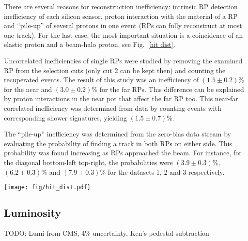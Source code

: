 \documentclass[doublecol]{../macros/epl2}
\def\un#1{\,{\rm #1}}
\begin{document}
There are several reasons for reconstruction inefficiency: intrinsic RP detection inefficiency of each silicon sensor, proton interaction with the material of a RP and ``pile-up'' of several protons in one event (RPs can fully reconstruct at most one track). For the last case, the most important situation is a coincidence of an elastic proton and a beam-halo proton, see Fig.~\ref{hit dist}.

Uncorrelated inefficiencies of single RPs were studied by removing the examined RP from the selection cuts (only cut 2 can be kept then) and counting the recuperated events. The result of this study was an inefficiency of $(1.5 \pm 0.2)\%$ for the near and $(3.0 \pm 0.2)\%$ for the far RPs. This difference can be explained by proton interactions in the near pot that affect the far RP too. This near-far correlated inefficiency was determined from data by counting events with corresponding shower signatures, yielding $(1.5\pm 0.7)\%$.

The ``pile-up'' inefficiency was determined from the zero-bias data stream by evaluating the probability of finding a track in both RPs on either side. This probability was found increasing as RPs approached the beam. For instance, for the diagonal bottom-left top-right, the probabilities were $(3.9 \pm 0.3)\%$, $(6.2 \pm 0.3)\%$ and $(7.9 \pm 0.3)\%$ for the datasets 1, 2 and 3 respectively.


\begin{figure*}
\begin{center}
\texttt{[image: fig/hit\_dist.pdf]}
\vskip-5mm
\caption{Hit distributions from dataset 3 in the far unit of the $220\un{m}$ station, right arm. Left: with diagonal cut only, Right: with all the elastic selection cuts (see Tab.~\ref{cuts}). The left plot clearly indicates the presence of the beam halo, which is eliminated by the selection cuts (the right plot). The distribution of elastic hits in right plot is sharply cut at about $|y| = 29\un{mm}$ which is a consequence of the LHC aperture limitations. }
\label{hit dist}
\end{center}
\end{figure*}

\subsection{Luminosity}

TODO: Lumi from CMS, 4\% uncertainty, Ken's pedestal subtraction
\end{document}
